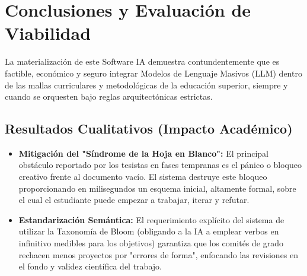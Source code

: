 \section{Conclusiones y Evaluación de Viabilidad}

La materialización de este Software IA demuestra contundentemente que es factible, económico y seguro integrar Modelos de Lenguaje Masivos (LLM) dentro de las mallas curriculares y metodológicas de la educación superior, siempre y cuando se orquesten bajo reglas arquitectónicas estrictas.

\subsection{Resultados Cualitativos (Impacto Académico)}
\begin{itemize}
    \item \textbf{Mitigación del "Síndrome de la Hoja en Blanco":} El principal obstáculo reportado por los tesistas en fases tempranas es el pánico o bloqueo creativo frente al documento vacío. El sistema destruye este bloqueo proporcionando en milisegundos un esquema inicial, altamente formal, sobre el cual el estudiante puede empezar a trabajar, iterar y refutar.
    \item \textbf{Estandarización Semántica:} El requerimiento explícito del sistema de utilizar la Taxonomía de Bloom (obligando a la IA a emplear verbos en infinitivo medibles para los objetivos) garantiza que los comités de grado rechacen menos proyectos por "errores de forma", enfocando las revisiones en el fondo y validez científica del trabajo.
\end{itemize}

